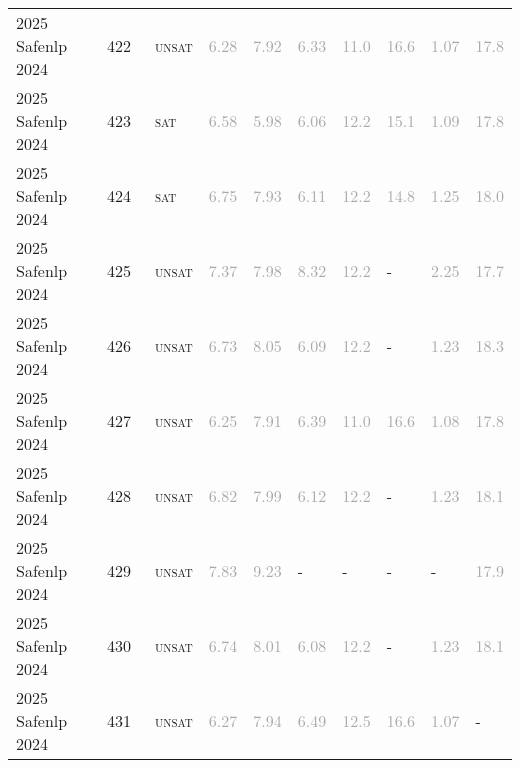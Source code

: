 \begin{center}
{\begin{longtable}{@{}llllllllll@{}}
2025 Safenlp 2024 & 422 & ~\textsc{unsat} & \textcolor{darkgray}{6.28} & \textcolor{darkgray}{7.92} & \textcolor{darkgray}{6.33} & \textcolor{darkgray}{11.0} & \textcolor{darkgray}{16.6} & \textcolor{darkgray}{1.07} & \textcolor{darkgray}{17.8} \\
2025 Safenlp 2024 & 423 & ~\textsc{sat} & \textcolor{darkgray}{6.58} & \textcolor{darkgray}{5.98} & \textcolor{darkgray}{6.06} & \textcolor{darkgray}{12.2} & \textcolor{darkgray}{15.1} & \textcolor{darkgray}{1.09} & \textcolor{darkgray}{17.8} \\
2025 Safenlp 2024 & 424 & ~\textsc{sat} & \textcolor{darkgray}{6.75} & \textcolor{darkgray}{7.93} & \textcolor{darkgray}{6.11} & \textcolor{darkgray}{12.2} & \textcolor{darkgray}{14.8} & \textcolor{darkgray}{1.25} & \textcolor{darkgray}{18.0} \\
2025 Safenlp 2024 & 425 & ~\textsc{unsat} & \textcolor{darkgray}{7.37} & \textcolor{darkgray}{7.98} & \textcolor{darkgray}{8.32} & \textcolor{darkgray}{12.2} & - & \textcolor{darkgray}{2.25} & \textcolor{darkgray}{17.7} \\
2025 Safenlp 2024 & 426 & ~\textsc{unsat} & \textcolor{darkgray}{6.73} & \textcolor{darkgray}{8.05} & \textcolor{darkgray}{6.09} & \textcolor{darkgray}{12.2} & - & \textcolor{darkgray}{1.23} & \textcolor{darkgray}{18.3} \\
2025 Safenlp 2024 & 427 & ~\textsc{unsat} & \textcolor{darkgray}{6.25} & \textcolor{darkgray}{7.91} & \textcolor{darkgray}{6.39} & \textcolor{darkgray}{11.0} & \textcolor{darkgray}{16.6} & \textcolor{darkgray}{1.08} & \textcolor{darkgray}{17.8} \\
2025 Safenlp 2024 & 428 & ~\textsc{unsat} & \textcolor{darkgray}{6.82} & \textcolor{darkgray}{7.99} & \textcolor{darkgray}{6.12} & \textcolor{darkgray}{12.2} & - & \textcolor{darkgray}{1.23} & \textcolor{darkgray}{18.1} \\
2025 Safenlp 2024 & 429 & ~\textsc{unsat} & \textcolor{darkgray}{7.83} & \textcolor{darkgray}{9.23} & - & - & - & - & \textcolor{darkgray}{17.9} \\
2025 Safenlp 2024 & 430 & ~\textsc{unsat} & \textcolor{darkgray}{6.74} & \textcolor{darkgray}{8.01} & \textcolor{darkgray}{6.08} & \textcolor{darkgray}{12.2} & - & \textcolor{darkgray}{1.23} & \textcolor{darkgray}{18.1} \\
2025 Safenlp 2024 & 431 & ~\textsc{unsat} & \textcolor{darkgray}{6.27} & \textcolor{darkgray}{7.94} & \textcolor{darkgray}{6.49} & \textcolor{darkgray}{12.5} & \textcolor{darkgray}{16.6} & \textcolor{darkgray}{1.07} & - \\

\end{longtable}}
\end{center}
